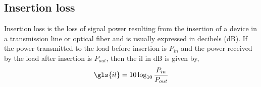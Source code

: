 \documentclass[../report.tex]{subfiles}
\begin{document}
\subsection{Insertion loss}
Insertion loss is the loss of signal power resulting from the insertion of a device in a transmission line or optical fiber and is usually expressed in decibels (dB). If the power transmitted to the load before insertion is $P_{in}$ and the power received by the load after insertion is $P_{out}$, then the \gls{il} in dB is given by,
\begin{equation}\label{eq:insertion_loss}
\gls{il} = 10\log _{10} \dfrac {P_{in}} {P_{out}}
\end{equation}
\end{document}
